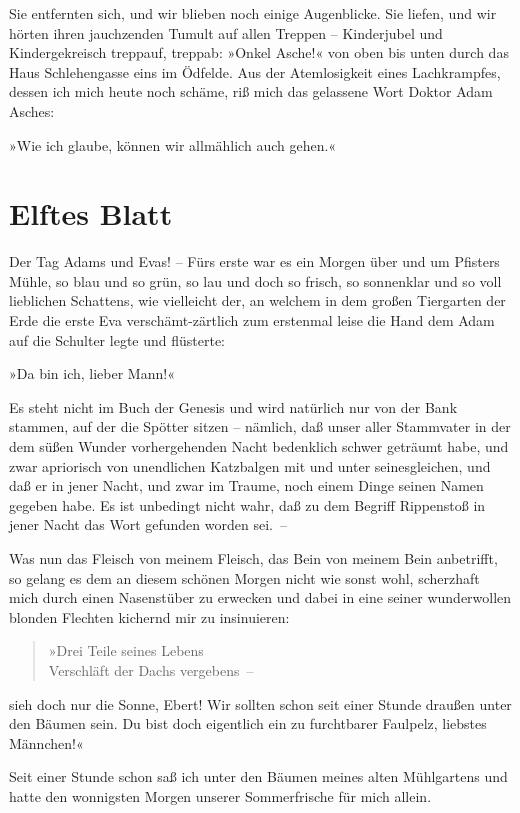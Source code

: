 Sie entfernten sich, und wir blieben noch einige Augenblicke. Sie
liefen, und wir hörten ihren jauchzenden Tumult auf allen Treppen –
Kinderjubel und Kindergekreisch treppauf, treppab: »Onkel Asche!«
von oben bis unten durch das Haus Schlehengasse eins im Ödfelde.
Aus der Atemlosigkeit eines Lachkrampfes, dessen ich mich heute
noch schäme, riß mich das gelassene Wort Doktor Adam Asches:

»Wie ich glaube, können wir allmählich auch gehen.«

\section{Elftes Blatt}

Der Tag Adams und Evas! – Fürs erste war es ein Morgen über und um
Pfisters Mühle, so blau und so grün, so lau und doch so frisch, so
sonnenklar und so voll lieblichen Schattens, wie vielleicht der, an
welchem in dem großen Tiergarten der Erde die erste Eva
verschämt-zärtlich zum erstenmal leise die Hand dem Adam auf die
Schulter legte und flüsterte:

»Da bin ich, lieber Mann!«

Es steht nicht im Buch der Genesis und wird natürlich nur von der
Bank stammen, auf der die Spötter sitzen – nämlich, daß unser aller
Stammvater in der dem süßen Wunder vorhergehenden Nacht bedenklich
schwer geträumt habe, und zwar apriorisch von unendlichen
Katzbalgen mit und unter seinesgleichen, und daß er in jener Nacht,
und zwar im Traume, noch einem Dinge seinen Namen gegeben habe. Es
ist unbedingt nicht wahr, daß zu dem Begriff Rippenstoß in jener
Nacht das Wort gefunden worden sei.~–

Was nun das Fleisch von meinem Fleisch, das Bein von meinem Bein
anbetrifft, so gelang es dem an diesem schönen Morgen nicht wie
sonst wohl, scherzhaft mich durch einen Nasenstüber zu erwecken und
dabei in eine seiner wunderwollen blonden Flechten kichernd mir zu
insinuieren:

\begin{verse}
»Drei Teile seines Lebens\\
Verschläft der Dachs vergebens~–
\end{verse}
\noindent
sieh doch nur die Sonne, Ebert! Wir sollten schon seit einer
Stunde draußen unter den Bäumen sein. Du bist doch eigentlich ein
zu furchtbarer Faulpelz, liebstes Männchen!«

Seit einer Stunde schon saß ich unter den Bäumen meines alten
Mühlgartens und hatte den wonnigsten Morgen unserer Sommerfrische
für mich allein.

